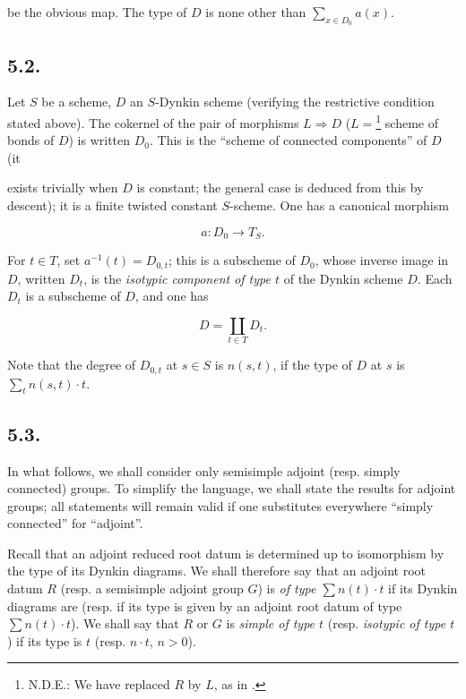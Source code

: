 be the obvious map. The type of \(D\) is none other than \(\sum_{x \in D_{0}} a(x)\).

\subsection*{5.2.}

Let \(S\) be a scheme, \(D\) an \(S\)-Dynkin scheme (verifying the restrictive condition stated above). The cokernel of the
pair of morphisms \(L \Rightarrow D\) (\(L =\)\footnote{N.D.E.: We have replaced \(R\) by \(L\), as in .} scheme of bonds of \(D\)) is written \(D_0\). This is the ``scheme
of connected components'' of \(D\) (it

exists trivially when \(D\) is constant; the general case is deduced from this by descent); it is a finite twisted
constant \(S\)-scheme. One has a canonical morphism

\[ a : D_{0} \to T_{S}. \]

For \(t \in T\), set \(a^{-1}(t) = D_{0, t}\); this is a subscheme of \(D_0\), whose inverse image in \(D\), written \(D_{t}\), is
the \emph{isotypic component of type \(t\)} of the Dynkin scheme \(D\). Each \(D_{t}\) is a subscheme of \(D\), and one has

\[
  D=\coprod_{t\in T}D_t.
\]

Note that the degree of \(D_{0, t}\) at \(s \in S\) is \(n(s, t)\), if the type of \(D\) at \(s\) is \(\sum_{t} n(s, t) \cdot t\).

\subsection*{5.3.}

In what follows, we shall consider only semisimple adjoint (resp. simply connected) groups. To simplify the language, we
shall state the results for adjoint groups; all statements will remain valid if one substitutes everywhere ``simply
connected'' for ``adjoint''.

Recall that an adjoint reduced root datum is determined up to isomorphism by the type of its Dynkin diagrams. We shall
therefore say that an adjoint root datum \(R\) (resp. a semisimple adjoint group \(G\)) is \emph{of type \(\sum n(t) \cdot t\)} if
its Dynkin diagrams are (resp. if its type is given by an adjoint root datum of type \(\sum n(t) \cdot t\)). We shall say
that \(R\) or \(G\) is \emph{simple of type \(t\)} (resp. \emph{isotypic of type \(t\)}) if its type is \(t\) (resp. \(n \cdot t\), \(n > 0\)).

